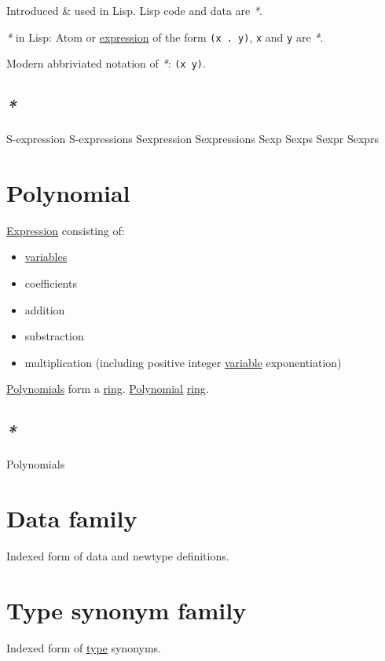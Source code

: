 \documentclass[a4paper,14pt,oneside]{book}
\begin{document}
Introduced \& used in Lisp. Lisp code and data are \emph{*}.

\emph{*} in Lisp: Atom or \hyperref[org755d8b0]{expression} of the form \texttt{(x . y)}, \texttt{x} and \texttt{y} are \emph{*}.

Modern abbriviated notation of \emph{*}: \texttt{(x y)}.

\section{\emph{*}}
\label{sec:org8ae08d5}

\label{org2528a19}S-expression
\label{org94730c4}S-expressions
\label{org39c7e3e}Sexpression
\label{org25db797}Sexpressions
\label{orgf4257a6}Sexp
\label{org940480e}Sexps
\label{org945c3bb}Sexpr
\label{org2e296ac}Sexprs

\chapter{\label{org678a810}Polynomial}
\label{sec:orgb90531d}
\hyperref[org755d8b0]{Expression} consisting of:
\begin{itemize}
\item \hyperref[orgea860d1]{variables}
\item coefficients
\item addition
\item substraction
\item multiplication (including positive integer \hyperref[org00eb23e]{variable} exponentiation)
\end{itemize}

\hyperref[orga254612]{Polynomials} form a \hyperref[org056ffbd]{ring}. \hyperref[org678a810]{Polynomial} \hyperref[org056ffbd]{ring}.

\section{\emph{*}}
\label{sec:orge4c8251}

\label{orga254612}Polynomials

\chapter{\label{org3e40a0c}Data family}
\label{sec:org3f1047d}
Indexed form of data and newtype definitions.

\chapter{\label{orgf592133}Type synonym family}
\label{sec:orgeade5a2}
Indexed form of \hyperref[org99e5c3b]{type} synonyms.
\end{document}
